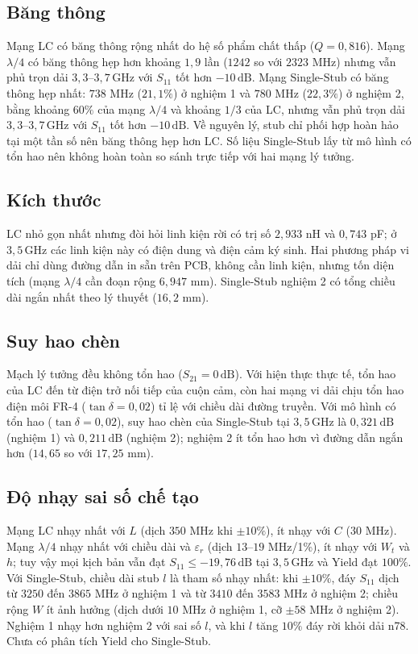 \documentclass[a4paper]{report}
\newcommand\dB{\,\mathrm{dB}}
\newcommand\GHz{\,\mathrm{GHz}}
\begin{document}
\subsection{Băng thông}
Mạng LC có băng thông rộng nhất do hệ số phẩm chất thấp ($Q=0{,}816$). Mạng $\lambda/4$ có băng thông hẹp hơn khoảng $1{,}9$ lần ($1242$ so với $2323$ MHz) nhưng vẫn phủ trọn dải $3{,}3$--$3{,}7\GHz$ với $S_{11}$ tốt hơn $-10\dB$. Mạng Single-Stub có băng thông hẹp nhất: $738$ MHz ($21{,}1\%$) ở nghiệm 1 và $780$ MHz ($22{,}3\%$) ở nghiệm 2, bằng khoảng $60\%$ của mạng $\lambda/4$ và khoảng $1/3$ của LC, nhưng vẫn phủ trọn dải $3{,}3$--$3{,}7\GHz$ với $S_{11}$ tốt hơn $-10\dB$. Về nguyên lý, stub chỉ phối hợp hoàn hảo tại một tần số nên băng thông hẹp hơn LC. Số liệu Single-Stub lấy từ mô hình có tổn hao nên không hoàn toàn so sánh trực tiếp với hai mạng lý tưởng.

\subsection{Kích thước}
LC nhỏ gọn nhất nhưng đòi hỏi linh kiện rời có trị số $2{,}933$ nH và $0{,}743$ pF; ở $3{,}5\GHz$ các linh kiện này có điện dung và điện cảm ký sinh. Hai phương pháp vi dải chỉ dùng đường dẫn in sẵn trên PCB, không cần linh kiện, nhưng tốn diện tích (mạng $\lambda/4$ cần đoạn rộng $6{,}947$ mm). Single-Stub nghiệm 2 có tổng chiều dài ngắn nhất theo lý thuyết ($16{,}2$ mm).

\subsection{Suy hao chèn}
Mạch lý tưởng đều không tổn hao ($S_{21}=0\dB$). Với hiện thực thực tế, tổn hao của LC đến từ điện trở nối tiếp của cuộn cảm, còn hai mạng vi dải chịu tổn hao điện môi FR-4 ($\tan\delta=0{,}02$) tỉ lệ với chiều dài đường truyền. Với mô hình có tổn hao ($\tan\delta=0{,}02$), suy hao chèn của Single-Stub tại $3{,}5\GHz$ là $0{,}321\dB$ (nghiệm 1) và $0{,}211\dB$ (nghiệm 2); nghiệm 2 ít tổn hao hơn vì đường dẫn ngắn hơn ($14{,}65$ so với $17{,}25$ mm).

\subsection{Độ nhạy sai số chế tạo}
Mạng LC nhạy nhất với $L$ (dịch $350$ MHz khi $\pm10\%$), ít nhạy với $C$ ($30$ MHz). Mạng $\lambda/4$ nhạy nhất với chiều dài và $\varepsilon_r$ (dịch $13$--$19$ MHz/1\%), ít nhạy với $W_t$ và $h$; tuy vậy mọi kịch bản vẫn đạt $S_{11}\le-19{,}76\dB$ tại $3{,}5\GHz$ và Yield đạt $100\%$. Với Single-Stub, chiều dài stub $l$ là tham số nhạy nhất: khi $\pm10\%$, đáy $S_{11}$ dịch từ $3250$ đến $3865$ MHz ở nghiệm 1 và từ $3410$ đến $3583$ MHz ở nghiệm 2; chiều rộng $W$ ít ảnh hưởng (dịch dưới $10$ MHz ở nghiệm 1, cỡ $\pm58$ MHz ở nghiệm 2). Nghiệm 1 nhạy hơn nghiệm 2 với sai số $l$, và khi $l$ tăng $10\%$ đáy rời khỏi dải n78. Chưa có phân tích Yield cho Single-Stub.
\end{document}

